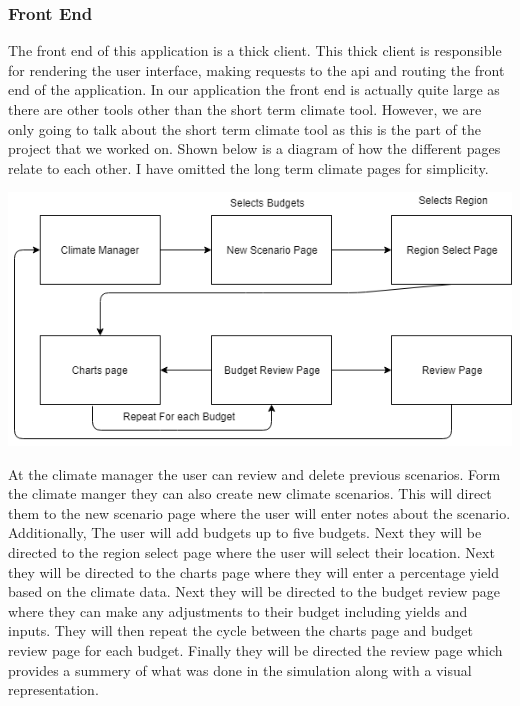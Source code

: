 \documentclass[onecolumn, draftclsnofoot,10pt, compsoc]{article}
\begin{document}
        \subsubsection{Front End}
        The front end of this application is a thick client. This thick client is responsible for rendering the user interface, making requests to the api and routing the front end of the application. In our application the front end is actually quite large as there are other tools other than the short term climate tool. However, we are only going to talk about the short term climate tool as this is the part of the project that we worked on. Shown below is a diagram of how the different pages relate to each other. I have omitted the long term climate pages for simplicity.\\
        
        \begin{center}
        \includegraphics[width=15cm]{./Images/Front-End.png}
        \end{center}
        
        At the climate manager the user can review and delete previous scenarios. Form the climate manger they can also create new climate scenarios. This will direct them to the new scenario page where the user will enter notes about the scenario. Additionally, The user will add budgets up to five budgets. Next they will be directed to the region select page where the user will select their location. Next they will be directed to the charts page where they will enter a percentage yield based on the climate data. Next they will be directed to the budget review page where they can make any adjustments to their budget including yields and inputs. They will then repeat the cycle between the charts page and budget review page for each budget. Finally they will be directed the review page which provides a summery of what was done in the simulation along with a visual representation.\\
        
\end{document}

